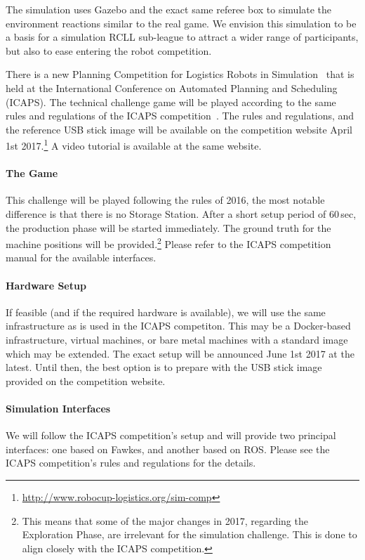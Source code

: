 \documentclass[12pt,twoside]{article}
\begin{document}
The simulation uses Gazebo and the exact same referee box to simulate
the environment reactions similar to the real game. We envision this
simulation to be a basis for a simulation RCLL sub-league to attract a
wider range of participants, but also to ease entering the robot
competition.

There is a new Planning Competition for Logistics Robots in
Simulation~\cite{LogRobComp2016} that is held at the International
Conference on Automated Planning and Scheduling (ICAPS). The technical
challenge game will be played according to the same rules and
regulations of the ICAPS competition~\cite{LogRobComp-Rules-2017}. The
rules and regulations, and the reference USB stick image will be
available on the competition website April 1st
2017.\footnote{\url{http://www.robocup-logistics.org/sim-comp}} A
video tutorial is available at the same website.

\vspace{-2ex}\paragraph{The Game}
%
This challenge will be played following the rules of 2016, the most
notable difference is that there is no Storage Station. After a short
setup period of 60\,sec, the production phase will be started
immediately. The ground truth for the machine positions will be
provided.\footnote{This means that some of the major changes in 2017,
  regarding the Exploration Phase, are irrelevant for the simulation
  challenge. This is done to align closely with the ICAPS
  competition.} Please refer to the ICAPS competition manual for the
available interfaces.

\vspace{-2ex}\paragraph{Hardware Setup}
%
If feasible (and if the required hardware is available), we will use
the same infrastructure as is used in the ICAPS competiton. This may be a
Docker-based
infrastructure, virtual machines, or bare metal machines with a
standard image which may be extended. The exact setup will be
announced June 1st 2017 at the latest. Until then, the best option is
to prepare with the USB stick image provided on the competition
website.

\vspace{-2ex}\paragraph{Simulation Interfaces}
%
We will follow the ICAPS competition's setup and will provide two
principal interfaces: one based on Fawkes, and another based on
ROS\@. Please see the ICAPS competition's rules and regulations for the
details.
\end{document}
